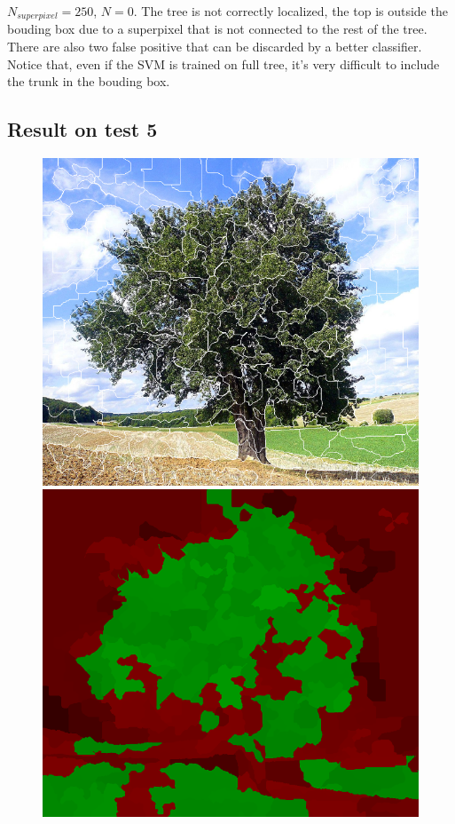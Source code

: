 \documentclass[a4paper,titlepaget]{article}
\begin{document}
$N_{superpixel}=250$, $N=0$. The tree is not correctly localized, the top is outside the bouding box due to a superpixel that is not connected to the rest of the tree. There are also two false positive that can be discarded by a better classifier. Notice that, even if the SVM is trained on full tree, it's very difficult to include the trunk in the bouding box. 
\newpage

\subsection{Result on test 5}
\begin{figure}[htpb] 
	\centering
	\begin{minipage}{.3\textwidth}
		\includegraphics[width=1.7\textwidth]{images/results/5seg} 
	\end{minipage}
	\hspace{.25\textwidth}
	\begin{minipage}{.3\textwidth}
		\includegraphics[width=1.7\textwidth]{images/results/5map}
	\end{minipage}  
\end{figure}
\end{document}
